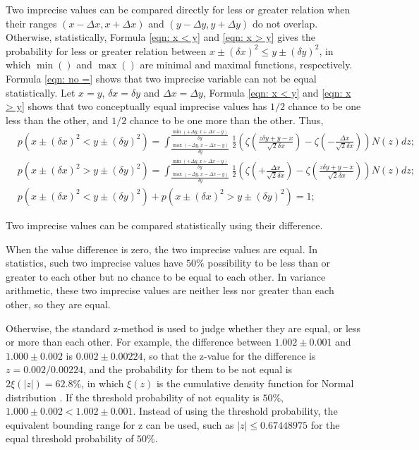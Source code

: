 \documentclass[twoside]{article}
\numberwithin{equation}{section}
\begin{document}
Two imprecise values can be compared directly for less or greater relation when their ranges $(x - \Delta x, x + \Delta x)$ and $(y - \Delta y, y + \Delta y)$ do not overlap. 
Otherwise, statistically, Formula \eqref{eqn: x < y} and \eqref{eqn: x > y} gives the probability for less or greater relation between $x \pm (\delta x)^2 \le y \pm (\delta y)^2$, in which $\min()$ and $\max()$ are minimal and maximal functions, respectively.
Formula \eqref{eqn: no =} shows that two imprecise variable can not be equal statistically.
Let $x = y$, $\delta x = \delta y$ and $\Delta x = \Delta y$, Formula \eqref{eqn: x < y} and \eqref{eqn: x > y} shows that two conceptually equal imprecise values has $1/2$ chance to be one less than the other, and $1/2$ chance to be one more than the other.
Thus,
\begin{align}
\label{eqn: x < y}
& p\left( x \pm (\delta x)^2 < y \pm (\delta y)^2 \right) = 
  \int_{\frac{\max(-\Delta y, x - \Delta x - y)}{\delta y}}^{\frac{\min(+\Delta y, x + \Delta x - y)}{\delta y}} 
      \frac{1}{2} \left(\zeta(\frac{z \delta y + y - x}{\sqrt{2} \delta x}) - \zeta(-\frac{\Delta x}{\sqrt{2} \delta x})\right) N(z) d z; \\
\label{eqn: x > y}
& p\left( x \pm (\delta x)^2 > y \pm (\delta y)^2 \right) =     
  \int_{\frac{\max(-\Delta y, x - \Delta x - y)}{\delta y}}^{\frac{\min(+\Delta y, x + \Delta x - y)}{\delta y}} 
      \frac{1}{2} \left(\zeta(+\frac{\Delta x}{\sqrt{2} \delta x}) - \zeta(\frac{z \delta y + y - x}{\sqrt{2} \delta x})\right) N(z) d z; \\
\label{eqn: no =}
& p\left( x \pm (\delta x)^2 < y \pm (\delta y)^2 \right) + p\left( x \pm (\delta x)^2 > y \pm (\delta y)^2 \right) = 1;
\end{align}

\fi

Two imprecise values can be compared statistically using their difference.

When the value difference is zero, the two imprecise values are equal.  
In statistics, such two imprecise values have $50\%$ possibility to be less than or greater to each other but no chance to be equal to each other.
In variance arithmetic, these two imprecise values are neither less nor greater than each other, so they are equal.

Otherwise, the standard z-method \cite{Probability_Statistics} is used to judge whether they are equal, or less or more than each other.
For example, the difference between $1.002 \pm 0.001$ and $1.000 \pm 0.002$ is $0.002 \pm 0.00224$, so that the z-value for the difference is $z = 0.002 / 0.00224$, and the probability for them to be not equal is $2\xi(|z|) = 62.8\%$, in which $\xi(z)$ is the cumulative density function for Normal distribution \cite{Probability_Statistics}.
If the threshold probability of not equality is $50\%$, $1.000 \pm 0.002 < 1.002 \pm 0.001$.
Instead of using the threshold probability, the equivalent bounding range for z can be used, such as $|z| \leq 0.67448975$ for the equal threshold probability of $50\%$.
\end{document}
